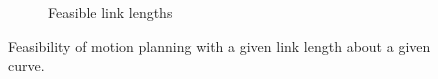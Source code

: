 \documentclass[12pt,a4]{article}
\begin{document}
\begin{figure}[ht!]
\begin{subfigure}{0.31\textwidth}
		\caption{Feasible link lengths \label{fig:largest_link}}
	\end{subfigure}
	\caption{ Feasibility of motion planning with a given link length about a given curve.}
\end{figure}
	
%
%
%   
\end{document}
